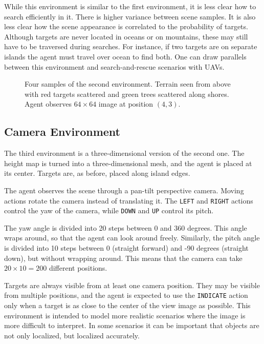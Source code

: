 While this environment is similar to the first environment, it is less clear how to search efficiently in it.
There is higher variance between scene samples.
It is also less clear how the scene appearance is correlated to the probability of targets.
Although targets are never located in oceans or on mountains, these may still have to be traversed during searches.
For instance, if two targets are on separate islands the agent must travel over ocean to find both.
One can draw parallels between this environment and search-and-rescue scenarios with UAVs.

\begin{figure}
    \centering
    
    \caption[Terrain environment]{Four samples of the second environment. Terrain seen from above with red targets scattered and green trees scattered along shores. Agent observes \(64 \times 64\) image at position \((4, 3)\).}
    \label{fig:terrain}
\end{figure}

\subsection{Camera Environment}

The third environment is a three-dimensional version of the second one.
The height map is turned into a three-dimensional mesh, and the agent is placed at its center.
Targets are, as before, placed along island edges.

The agent observes the scene through a pan-tilt perspective camera.
Moving actions rotate the camera instead of translating it.
The \texttt{LEFT} and \texttt{RIGHT} actions control the yaw of the camera, while \texttt{DOWN} and \texttt{UP} control its pitch.

The yaw angle is divided into 20 steps between 0 and 360 degrees.
This angle wraps around, so that the agent can look around freely.
Similarly, the pitch angle is divided into 10 steps between 0 (straight forward) and -90 degrees (straight down), but without wrapping around.
This means that the camera can take \(20 \times 10 = 200\) different positions.

Targets are always visible from at least one camera position.
They may be visible from multiple positions, and the agent is expected to use the \texttt{INDICATE} action only when a target is as close to the center of the view image as possible.
This environment is intended to model more realistic scenarios where the image is more difficult to interpret.
In some scenarios it can be important that objects are not only localized, but localized accurately.

